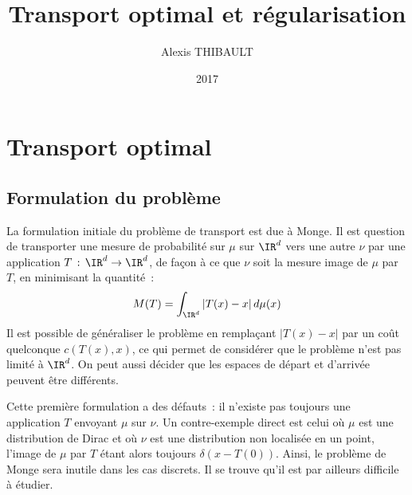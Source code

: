 

\DeclareMathOperator{\diag}{\mathbf{diag}}

\title{Transport optimal et régularisation}
\author{Alexis THIBAULT}
\date{2017}



\maketitle

\tableofcontents

\section{Transport optimal}

\subsection{Formulation du problème}
La formulation initiale du problème de transport est due à Monge. Il est question de transporter une mesure de probabilité sur $\mu$ sur $\IR^d$ vers une autre $\nu$ par une application $T\,:\,\IR^d \rightarrow \IR^d$, de façon à ce que $\nu$ soit la mesure image de $\mu$ par $T$, en minimisant la quantité~:
\begin{equation}
\label{eq:monge}
M(T) = \int_{\IR^d} |T(x)-x|\,d\mu(x)
\end{equation}
Il est possible de généraliser le problème en remplaçant $|T(x)-x|$ par un coût quelconque $c(T(x),x)$, ce qui permet de considérer que le problème n'est pas limité à $\IR^d$. On peut aussi décider que les espaces de départ et d'arrivée peuvent être différents.

Cette première formulation a des défauts~: il n'existe pas toujours une application $T$ envoyant $\mu$ sur $\nu$. Un contre-exemple direct est celui où $\mu$ est une distribution de Dirac et où $\nu$ est une distribution non localisée en un point, l'image de $\mu$ par $T$ étant alors toujours $\delta(x-T(0))$. Ainsi, le problème de Monge sera inutile dans les cas discrets. Il se trouve qu'il est par ailleurs difficile à étudier.

